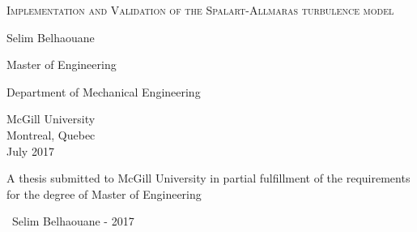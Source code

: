 \begin{titlepage}
	\centering
	\newcommand{\titlespace}{\vfill}
	{\Large \scshape
	Implementation and Validation of the Spalart-Allmaras turbulence model
	\par}
	\titlespace
	{\large Selim Belhaouane\par}
	\titlespace
	{\large Master of Engineering\par}
	\titlespace
	{\large Department of Mechanical Engineering\par}
	\titlespace
	{\large McGill University\\ Montreal, Quebec\\
	July 2017 \par}
	\titlespace
	{\large A thesis submitted to McGill University in partial fulfillment of the requirements for the degree of Master of Engineering\par}
	\vspace{0.25in}
	\vfill
	{\large \textcopyright \ Selim Belhaouane - 2017\par}

\end{titlepage}
